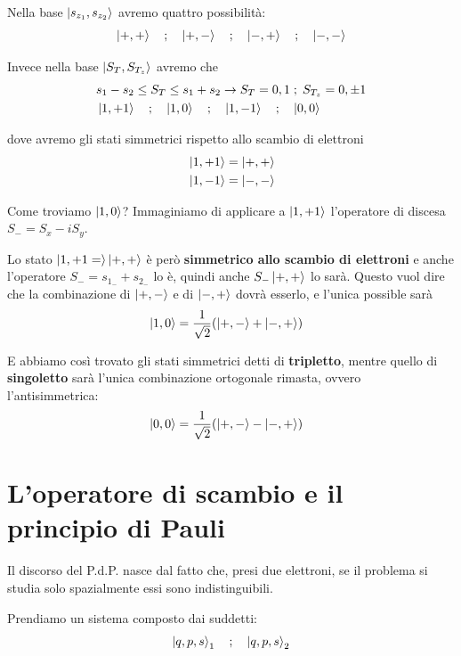 Nella base $\ket{s_{z_1},s_{z_2}}$ avremo quattro possibilità:
\begin{align}
\ket{+,+} \quad;\quad \ket{+,-} \quad;\quad \ket{-,+} \quad;\quad \ket{-,-}
\end{align}

Invece nella base $\ket{S_T,S_{T_z}}$ avremo che
\begin{align}
{}& s_1-s_2 \leq S_T \leq s_1+s_2 \rightarrow S_T=0,1 \; ;\; S_{T_z}=0,\pm 1 \\
& \ket{1,+1} \quad;\quad \ket{1,0} \quad;\quad \ket{1,-1} \quad;\quad \ket{0,0}
\end{align}

dove avremo gli stati simmetrici rispetto allo scambio di elettroni
\begin{align}
{}&\ket{1,+1} = \ket{+,+} \\
&\ket{1,-1} = \ket{-,-} \\
\end{align}

Come troviamo $\ket{1,0}$? Immaginiamo di applicare a $\ket{1,+1}$ l'operatore di discesa $S_-= S_x - iS_y$. 

Lo stato $\ket{1,+1= }\ket{+,+}$ è però \textbf{simmetrico allo scambio di elettroni} e anche l'operatore $S_-=s_{1_-}+s_{2_-}$ lo è, quindi anche $S_-\ket{+,+}$ lo sarà. Questo vuol dire che la combinazione di $\ket{+,-}$ e di $\ket{-,+}$ dovrà esserlo, e l'unica possible sarà
\begin{align}
&\ket{1,0} = \frac{1}{\sqrt{2}}(\ket{+,-} + \ket{-,+})
\end{align}

E abbiamo così trovato gli stati simmetrici detti di \textbf{tripletto}, mentre quello di \textbf{singoletto} sarà l'unica combinazione ortogonale rimasta, ovvero l'antisimmetrica:
\begin{align}
&\ket{0,0} = \frac{1}{\sqrt{2}}(\ket{+,-} - \ket{-,+})
\end{align}

\newpage

\section{L'operatore di scambio e il principio di Pauli}

Il discorso del P.d.P. nasce dal fatto che, presi due elettroni, se il problema si studia solo spazialmente essi sono indistinguibili.

Prendiamo un sistema composto dai suddetti:
\begin{align}
\ket{q,p,s}_1 \quad;\quad \ket{q,p,s}_2
\end{align}

